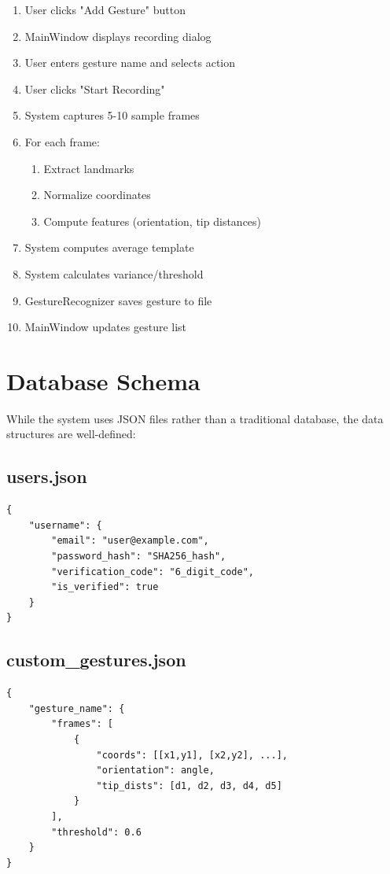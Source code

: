 \documentclass[12pt,a4paper]{report}
\begin{document}
\begin{enumerate}
    \item User clicks "Add Gesture" button
    \item MainWindow displays recording dialog
    \item User enters gesture name and selects action
    \item User clicks "Start Recording"
    \item System captures 5-10 sample frames
    \item For each frame:
    \begin{enumerate}
        \item Extract landmarks
        \item Normalize coordinates
        \item Compute features (orientation, tip distances)
    \end{enumerate}
    \item System computes average template
    \item System calculates variance/threshold
    \item GestureRecognizer saves gesture to file
    \item MainWindow updates gesture list
\end{enumerate}

\section{Database Schema}

While the system uses JSON files rather than a traditional database, the data structures are well-defined:

\subsection{users.json}
\begin{verbatim}
{
    "username": {
        "email": "user@example.com",
        "password_hash": "SHA256_hash",
        "verification_code": "6_digit_code",
        "is_verified": true
    }
}
\end{verbatim}

\subsection{custom\_gestures.json}
\begin{verbatim}
{
    "gesture_name": {
        "frames": [
            {
                "coords": [[x1,y1], [x2,y2], ...],
                "orientation": angle,
                "tip_dists": [d1, d2, d3, d4, d5]
            }
        ],
        "threshold": 0.6
    }
}
\end{verbatim}
\end{document}

